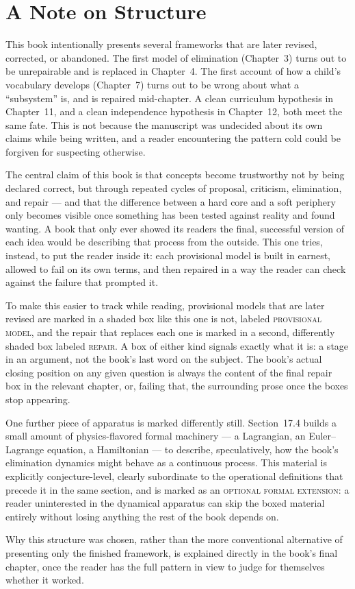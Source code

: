 \chapter*{A Note on Structure}

This book intentionally presents several frameworks that are later revised, corrected, or abandoned. The first model of elimination (Chapter~3) turns out to be unrepairable and is replaced in Chapter~4. The first account of how a child's vocabulary develops (Chapter~7) turns out to be wrong about what a ``subsystem'' is, and is repaired mid-chapter. A clean curriculum hypothesis in Chapter~11, and a clean independence hypothesis in Chapter~12, both meet the same fate. This is not because the manuscript was undecided about its own claims while being written, and a reader encountering the pattern cold could be forgiven for suspecting otherwise.

The central claim of this book is that concepts become trustworthy not by being declared correct, but through repeated cycles of proposal, criticism, elimination, and repair --- and that the difference between a hard core and a soft periphery only becomes visible once something has been tested against reality and found wanting. A book that only ever showed its readers the final, successful version of each idea would be describing that process from the outside. This one tries, instead, to put the reader inside it: each provisional model is built in earnest, allowed to fail on its own terms, and then repaired in a way the reader can check against the failure that prompted it.

To make this easier to track while reading, provisional models that are later revised are marked in a shaded box like this one is not, labeled \textsc{provisional model}, and the repair that replaces each one is marked in a second, differently shaded box labeled \textsc{repair}. A box of either kind signals exactly what it is: a stage in an argument, not the book's last word on the subject. The book's actual closing position on any given question is always the content of the final repair box in the relevant chapter, or, failing that, the surrounding prose once the boxes stop appearing.

One further piece of apparatus is marked differently still. Section~17.4 builds a small amount of physics-flavored formal machinery --- a Lagrangian, an Euler--Lagrange equation, a Hamiltonian --- to describe, speculatively, how the book's elimination dynamics might behave as a continuous process. This material is explicitly conjecture-level, clearly subordinate to the operational definitions that precede it in the same section, and is marked as an \textsc{optional formal extension}: a reader uninterested in the dynamical apparatus can skip the boxed material entirely without losing anything the rest of the book depends on.

Why this structure was chosen, rather than the more conventional alternative of presenting only the finished framework, is explained directly in the book's final chapter, once the reader has the full pattern in view to judge for themselves whether it worked.
